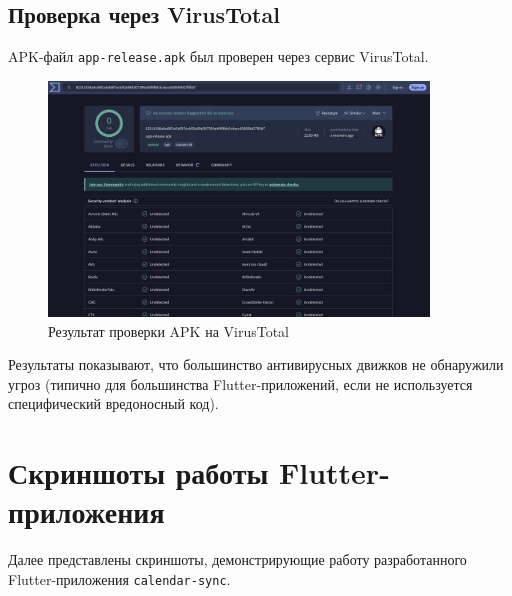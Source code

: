 \subsection{Проверка через VirusTotal}
APK-файл \texttt{app-release.apk} был проверен через сервис VirusTotal.
\begin{figure}[h!]
    \centering
    \includegraphics[width=0.9\textwidth]{images/virustotal.png}
    \caption{Результат проверки APK на VirusTotal}
    \label{fig:virustotal}
\end{figure}
Результаты показывают, что большинство антивирусных движков не обнаружили угроз (типично для большинства Flutter-приложений, если не используется специфический вредоносный код).

\section{Скриншоты работы Flutter-приложения}
Далее представлены скриншоты, демонстрирующие работу разработанного Flutter-приложения \texttt{calendar-sync}.

